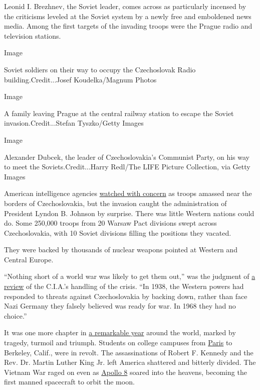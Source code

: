 Leonid I. Brezhnev, the Soviet leader, comes across as particularly
incensed by the criticisms leveled at the Soviet system by a newly free
and emboldened news media. Among the first targets of the invading
troops were the Prague radio and television stations.

Image

Soviet soldiers on their way to occupy the Czechoslovak Radio
building.Credit...Josef Koudelka/Magnum Photos

Image

A family leaving Prague at the central railway station to escape the
Soviet invasion.Credit...Stefan Tyszko/Getty Images

Image

Alexander Dubcek, the leader of Czechoslovakia's Communist Party, on his
way to meet the Soviets.Credit...Harry Redl/The LIFE Picture Collection,
via Getty Images

American intelligence agencies
\href{https://www.cia.gov/news-information/featured-story-archive/2008-featured-story-archive/a-look-back-the-prague-spring-the-soviet.html}{watched
with concern} as troops amassed near the borders of Czechoslovakia, but
the invasion caught the administration of President Lyndon B. Johnson by
surprise. There was little Western nations could do. Some 250,000 troops
from 20 Warsaw Pact divisions swept across Czechoslovakia, with 10
Soviet divisions filling the positions they vacated.

They were backed by thousands of nuclear weapons pointed at Western and
Central Europe.

``Nothing short of a world war was likely to get them out,'' was the
judgment of
\href{https://www.cia.gov/news-information/featured-story-archive/2008-featured-story-archive/a-look-back-the-prague-spring-the-soviet.html}{a
review} of the C.I.A.'s handling of the crisis. ``In 1938, the Western
powers had responded to threats against Czechoslovakia by backing down,
rather than face Nazi Germany they falsely believed was ready for war.
In 1968 they had no choice.''

It was one more chapter in
\href{https://www.nytimes.com/interactive/2018/01/15/us/1968-history.html}{a
remarkable year} around the world, marked by tragedy, turmoil and
triumph. Students on college campuses from
\href{https://www.nytimes.com/2018/05/05/world/europe/france-may-1968-revolution.html}{Paris}
to Berkeley, Calif., were in revolt. The assassinations of Robert F.
Kennedy and the Rev. Dr. Martin Luther King Jr. left America shattered
and bitterly divided. The Vietnam War raged on even as
\href{https://timesmachine.nytimes.com/timesmachine/1968/12/25/76924273.html?action=click\&contentCollection=Archives\&module=ArticleEndCTA\&region=ArchiveBody\&pgtype=article}{Apollo
8} soared into the heavens, becoming the first manned spacecraft to
orbit the moon.

